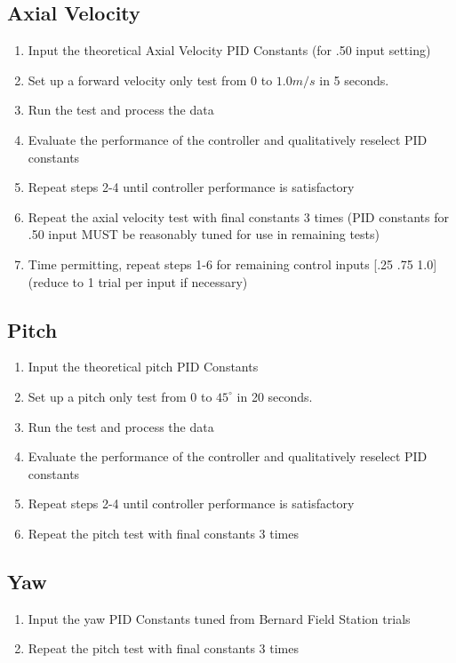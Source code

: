 \documentclass{article}
\begin{document}
\subsection*{Axial Velocity}
\begin{enumerate}
\item Input the theoretical Axial Velocity PID Constants (for .50 input setting)
\item Set up a forward velocity only test from 0 to $1.0 m/s$ in 5 seconds.
\item Run the test and process the data
\item Evaluate the performance of the controller and qualitatively reselect PID constants
\item Repeat steps 2-4 until controller performance is satisfactory
\item Repeat the axial velocity test with final constants 3 times (PID constants for .50 input MUST be reasonably tuned for use in remaining tests)
\item Time permitting, repeat steps 1-6 for remaining control inputs [.25 .75 1.0] (reduce to 1 trial per input if necessary)
\end{enumerate}


\subsection*{Pitch}
\begin{enumerate}
\item Input the theoretical pitch PID Constants
\item Set up a pitch only test from 0 to $45^\circ $ in 20 seconds.
\item Run the test and process the data
\item Evaluate the performance of the controller and qualitatively reselect PID constants
\item Repeat steps 2-4 until controller performance is satisfactory
\item Repeat the pitch test with final constants 3 times
\end{enumerate}

\subsection*{Yaw}
\begin{enumerate}
\item Input the yaw PID Constants tuned from Bernard Field Station trials
\item Repeat the pitch test with final constants 3 times
\end{enumerate}
\end{document}
